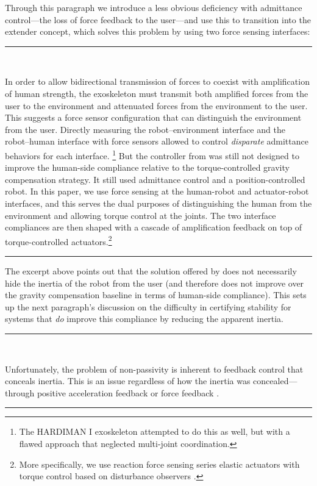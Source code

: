 \documentclass[10pt,letterpaper]{letter}
\newcommand*{\ta}[1]{\textcolor[HTML]{107f10}{#1}}
\newcommand{\paperquote}[1]{%
	\begin{center}
		
		\begin{minipage}{.8\textwidth}
			{\rule{\textwidth}{.5pt}}\vspace{.5em}\\
			\begin{minipage}{\textwidth}\setlength{\parindent}{2em}#1\end{minipage}
			\vspace{.5em}
			{\rule{\textwidth}{.5pt}}
		\end{minipage}%
	\end{center}
}
\begin{document}
\begin{letter}{}
{}
Through this paragraph we introduce a less obvious deficiency with admittance control---the loss of force feedback to the user---and use this to transition into the extender concept, which solves this problem by using two force sensing interfaces:
\paperquote{
\ta{In order to allow bidirectional transmission of forces to coexist with amplification of human strength, the exoskeleton must transmit both amplified forces from the user to the environment and attenuated forces from the environment to the user.
	This suggests a force sensor configuration that can distinguish the environment from the user.
	Directly measuring the robot--environment interface and the robot--human interface with force sensors allowed \cite{KazerooniGuo1993JDSMC,KazerooniMahoney1991ICRA,KazerooniMahoney1991JDSMC} to control \emph{disparate} admittance behaviors for each interface.%
	\footnote{\ta{The HARDIMAN I exoskeleton \cite{MakinsonBodineFitck1969Techreport} attempted to do this as well, but with a flawed approach that neglected multi-joint coordination.}}
	But the controller from \cite{KazerooniGuo1993JDSMC} was still not designed to improve the human-side compliance relative to the torque-controlled gravity compensation strategy. It still used admittance control and a position-controlled robot.
	In this paper, we use force sensing at the human-robot and actuator-robot interfaces, and this serves the dual purposes of distinguishing the human from the environment and allowing torque control at the joints.
	The two interface compliances are then shaped with a cascade of amplification feedback on top of torque-controlled actuators.\footnote{More specifically, we use reaction force sensing series elastic actuators with torque control based on disturbance observers \cite{PaineOhSentis2014TMech,Paine2014Dissertation}.}}
}
The excerpt above points out that the solution offered by \cite{KazerooniGuo1993JDSMC} does not necessarily hide the inertia of the robot from the user (and therefore does not improve over the gravity compensation baseline in terms of human-side compliance). This sets up the next paragraph's discussion on the difficulty in certifying stability for systems that \emph{do} improve this compliance by reducing the apparent inertia.
\paperquote{
\ta{%
	Unfortunately, the problem of non-passivity is inherent to feedback control that conceals inertia. This is an issue regardless of how the inertia was concealed---through positive acceleration feedback \cite{Kazerooni2005IROS} or force feedback \cite{BuergerHogan2007TRO}.
}}
\end{letter}
\end{document}
